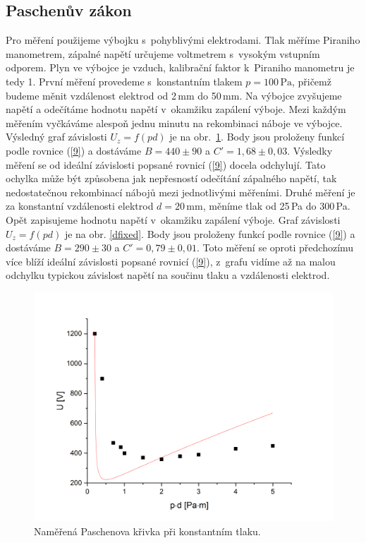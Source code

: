 \documentclass[a4paper,12pt]{article}
\begin{document}
\subsection{Paschenův zákon}
Pro měření použijeme výbojku s~pohyblivými elektrodami. Tlak měříme Piraniho 
manometrem, zápalné napětí určujeme voltmetrem s~vysokým vstupním odporem. Plyn 
ve výbojce je vzduch, kalibrační faktor k~Piraniho manometru je tedy 1. První 
měření provedeme s~konstantním tlakem $p = 100\,\si{\pascal}$, přičemž budeme 
měnit vzdálenost elektrod od 2\,\si{\milli\meter} do 50\,\si{\milli\meter}. Na 
výbojce zvyšujeme napětí a odečítáme hodnotu napětí v~okamžiku zapálení výboje. 
Mezi každým měřením vyčkáváme alespoň jednu minutu na rekombinaci náboje ve 
výbojce. Výsledný graf závislosti $U_z = f(pd)$ je na obr.~\ref{tlakfixed}. 
Body jsou proloženy funkcí podle rovnice (\ref{9}) a dostáváme $B = 440 \pm 90$ 
a $C' = 1,68 \pm 0,03$. Výsledky měření se od ideální závislosti popsané 
rovnicí (\ref{9}) docela odchylují. Tato ochylka může být způsobena jak 
nepřesností odečítání zápalného napětí, tak nedostatečnou rekombinací nábojů 
mezi jednotlivými měřeními. 
Druhé měření je za konstantní vzdálenosti elektrod $d = 20\,\si{\milli\meter}$, 
měníme tlak od 25\,\si{\pascal} do 300\,\si{\pascal}. Opět zapisujeme hodnotu 
napětí v~okamžiku zapálení výboje. Graf závislosti $U_z = f(pd)$ je na obr. 
\ref{dfixed}. Body jsou proloženy funkcí podle rovnice (\ref{9}) a dostáváme $B 
= 290 \pm 30$ a $C' = 0,79 \pm 0,01$. Toto měření se oproti předchozímu více 
blíží ideální závislosti popsané rovnicí (\ref{9}), z~grafu vidíme až na malou 
odchylku typickou závislost napětí na součinu tlaku a vzdálenosti elektrod.

\begin{figure}[h]
	\centering
	\includegraphics[width=130mm]{tlakfixed.png}
	\caption{Naměřená Paschenova křivka při konstantním tlaku.}
	\label{tlakfixed}
\end{figure}
\end{document}
